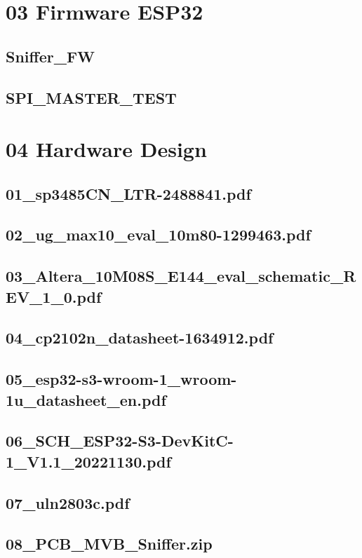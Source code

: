 \section{03 Firmware ESP32}
\label{app:Odner4}
\subsection{Sniffer\_FW}
\label{app:Ordner41}
\subsection{SPI\_MASTER\_TEST}
\label{app:Ordner42}

\section{04 Hardware Design}
\label{app:Odner5}
\subsection{01\_sp3485CN\_LTR-2488841.pdf}
\label{app:File51}
\subsection{02\_ug\_max10\_eval\_10m80-1299463.pdf}
\label{app:File52}
\subsection{03\_Altera\_10M08S\_E144\_eval\_schematic\_REV\_1\_0.pdf}
\label{app:File53}
\subsection{04\_cp2102n\_datasheet-1634912.pdf}
\label{app:File54}
\subsection{05\_esp32-s3-wroom-1\_wroom-1u\_datasheet\_en.pdf}
\label{app:File55}
\subsection{06\_SCH\_ESP32-S3-DevKitC-1\_V1.1\_20221130.pdf}
\label{app:File56}
\subsection{07\_uln2803c.pdf}
\label{app:File57}
\subsection{08\_PCB\_MVB\_Sniffer.zip}
\label{app:File58}

